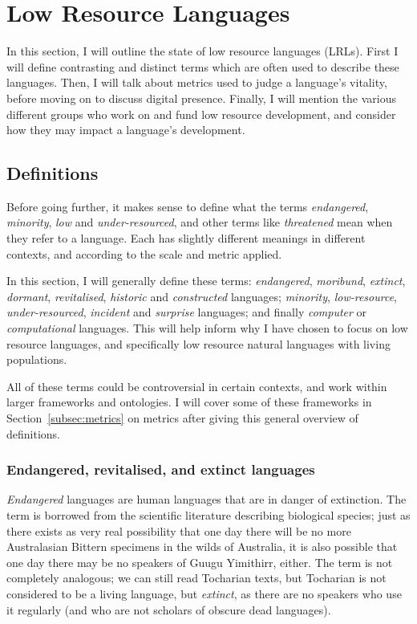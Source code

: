 \section{Low Resource Languages}
\label{sec:endlang}

In this section, I will outline the state of low resource languages (LRLs). First I will define contrasting and distinct terms which are often used to describe these languages. Then, I will talk about metrics used to judge a language's vitality, before moving on to discuss digital presence. Finally, I will mention the various different groups who work on and fund low resource development, and consider how they may impact a language's development.


\subsection{Definitions}

Before going further, it makes sense to define what the terms \emph{endangered}, \emph{minority}, \emph{low} and \emph{under-resourced}, and other terms like \emph{threatened} mean when they refer to a language. Each has slightly different meanings in different contexts, and according to the scale and metric applied.

In this section, I will generally define these terms: \textit{endangered}, \textit{moribund}, \textit{extinct}, \textit{dormant}, \textit{revitalised}, \textit{historic} and \textit{constructed} languages; \textit{minority}, \textit{low-resource}, \textit{under-resourced}, \textit{incident} and \textit{surprise} languages; and finally \textit{computer} or \textit{computational} languages. This will help inform why I have chosen to focus on low resource languages, and specifically low resource natural languages with living populations.

All of these terms could be controversial in certain contexts, and work within larger frameworks and ontologies. I will cover some of these frameworks in Section~\ref{subsec:metrics} on metrics after giving this general overview of definitions.

\subsubsection{Endangered, revitalised, and extinct languages}

\emph{Endangered} languages are human languages that are in danger of extinction. The term is borrowed from the scientific literature describing biological species; just as there exists as very real possibility that one day there will be no more Australasian Bittern specimens in the wilds of Australia, it is also possible that one day there may be no speakers of Guugu Yimithirr, either. The term is not completely analogous; we can still read Tocharian texts, but Tocharian is not considered to be a living language, but \textit{extinct}, as there are no speakers who use it regularly (and who are not scholars of obscure dead languages).

